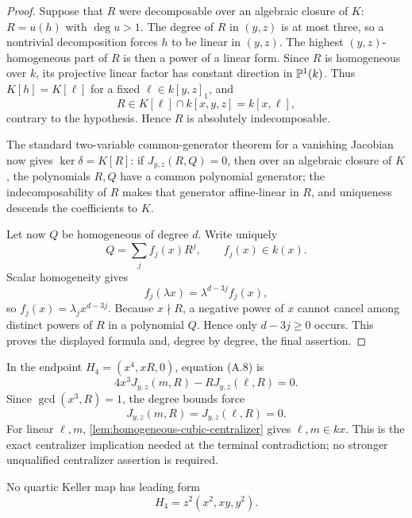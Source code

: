 \begin{proof}
Suppose that \(R\) were decomposable over an algebraic closure of \(K\):
\(R=u(h)\) with \(\deg u>1\).  The degree of \(R\) in \((y,z)\) is at most
three, so a nontrivial decomposition forces \(h\) to be linear in
\((y,z)\).  The highest \((y,z)\)-homogeneous part of \(R\) is then a power
of a linear form.  Since \(R\) is homogeneous over \(k\), its projective
linear factor has constant direction in \(\mathbb P^1(k)\).  Thus
\(K[h]=K[\ell]\) for a fixed \(\ell\in k[y,z]_1\), and
\[
 R\in K[\ell]\cap k[x,y,z]=k[x,\ell],
\]
contrary to the hypothesis.  Hence \(R\) is absolutely indecomposable.

The standard two-variable common-generator theorem for a vanishing
Jacobian now gives \(\ker\delta=K[R]\): if \(J_{y,z}(R,Q)=0\), then over an
algebraic closure of \(K\), the polynomials \(R,Q\) have a common polynomial
generator; the indecomposability of \(R\) makes that generator affine-linear
in \(R\), and uniqueness descends the coefficients to \(K\).

Let now \(Q\) be homogeneous of degree \(d\).  Write uniquely
\[
 Q=\sum_j f_j(x)R^j,\qquad f_j(x)\in k(x).
\]
Scalar homogeneity gives
\[
 f_j(\lambda x)=\lambda^{d-3j}f_j(x),
\]
so \(f_j(x)=\lambda_jx^{d-3j}\).  Because \(x\nmid R\), a negative power
of \(x\) cannot cancel among distinct powers of \(R\) in a polynomial
\(Q\).  Hence only \(d-3j\ge0\) occurs.  This proves the displayed formula
and, degree by degree, the final assertion.
\end{proof}

\begin{remark}
In the endpoint \(H_4=(x^4,xR,0)\), equation (A.8) is
\[
 4x^3J_{y,z}(m,R)-R J_{y,z}(\ell,R)=0.
\]
Since \(\gcd(x^3,R)=1\), the degree bounds force
\[
 J_{y,z}(m,R)=J_{y,z}(\ell,R)=0.
\]
For linear \(\ell,m\), \cref{lem:homogeneous-cubic-centralizer} gives
\(\ell,m\in kx\).  This is the exact centralizer implication needed at the
terminal contradiction; no stronger unqualified centralizer assertion is
required.
\end{remark}


\begin{proposition}
\label{prop:conic-z2-exclusion}
No quartic Keller map has leading form
\[
 H_4=z^2(x^2,xy,y^2).
\]
\end{proposition}

